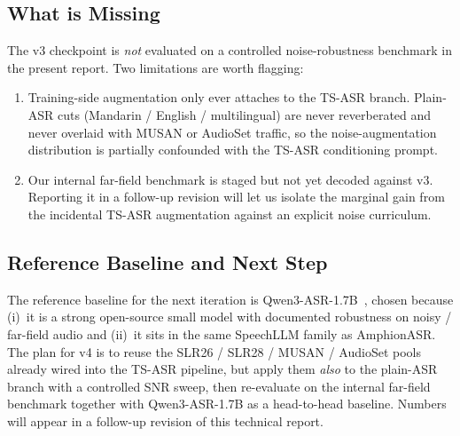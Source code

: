 \subsection{What is Missing}

The v3 checkpoint is \emph{not} evaluated on a controlled
noise-robustness benchmark in the present report. Two limitations are
worth flagging:

\begin{enumerate}
  \item Training-side augmentation only ever attaches to the TS-ASR
        branch. Plain-ASR cuts (Mandarin / English / multilingual) are
        never reverberated and never overlaid with MUSAN or AudioSet
        traffic, so the noise-augmentation distribution is partially
        confounded with the TS-ASR conditioning prompt.
  \item Our internal far-field benchmark
        is staged but not yet decoded against v3. Reporting it in a
        follow-up revision will let us isolate the marginal gain from
        the incidental TS-ASR augmentation against an explicit noise
        curriculum.
\end{enumerate}

\subsection{Reference Baseline and Next Step}

The reference baseline for the next iteration is
Qwen3-ASR-1.7B~\cite{qwen2025qwen3asr}, chosen because (i)~it is a
strong open-source small model with documented robustness on noisy /
far-field audio and (ii)~it sits in the same SpeechLLM family as
AmphionASR. The plan for v4 is to reuse the SLR26 / SLR28 / MUSAN /
AudioSet pools already wired into the TS-ASR pipeline, but apply them
\emph{also} to the plain-ASR branch with a controlled SNR sweep, then
re-evaluate on the internal far-field benchmark together with
Qwen3-ASR-1.7B as a head-to-head baseline. Numbers will appear in a
follow-up revision of this technical report.
